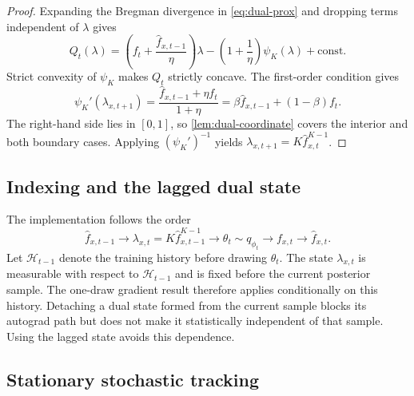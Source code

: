 \begin{proof}
Expanding the Bregman divergence in \cref{eq:dual-prox} and dropping terms independent of $\lambda$ gives
\begin{equation}
  Q_t(\lambda)
  =
  \left(f_t+\frac{\widehat f_{x,t-1}}{\eta}\right)\lambda
  -
  \left(1+\frac{1}{\eta}\right)\psi_K(\lambda)
  +\mathrm{const}.
  \label{eq:app-bregman-expanded}
\end{equation}
Strict convexity of $\psi_K$ makes $Q_t$ strictly concave.
The first-order condition gives
\begin{equation}
  \psi_K'(\lambda_{x,t+1})
  =
  \frac{\widehat f_{x,t-1}+\eta f_t}{1+\eta}
  =
  \beta\widehat f_{x,t-1}+(1-\beta)f_t.
  \label{eq:app-bregman-coordinate}
\end{equation}
The right-hand side lies in $[0,1]$, so \cref{lem:dual-coordinate} covers the interior and both boundary cases.
Applying $(\psi_K')^{-1}$ yields $\lambda_{x,t+1}=K\widehat f_{x,t}^{K-1}$.
\end{proof}

\subsection{Indexing and the lagged dual state}
\label{app:dual-indexing}

The implementation follows the order
\begin{equation}
  \widehat f_{x,t-1}
  \longrightarrow
  \lambda_{x,t}=K\widehat f_{x,t-1}^{K-1}
  \longrightarrow
  \theta_t\sim q_{\phi_t}
  \longrightarrow
  f_{x,t}
  \longrightarrow
  \widehat f_{x,t}.
  \label{eq:app-lagged-indexing}
\end{equation}
Let $\mathcal H_{t-1}$ denote the training history before drawing $\theta_t$.
The state $\lambda_{x,t}$ is measurable with respect to $\mathcal H_{t-1}$ and is fixed before the current posterior sample.
The one-draw gradient result therefore applies conditionally on this history.
Detaching a dual state formed from the current sample blocks its autograd path but does not make it statistically independent of that sample.
Using the lagged state avoids this dependence.

\subsection{Stationary stochastic tracking}
\label{app:stationary-tracking}


